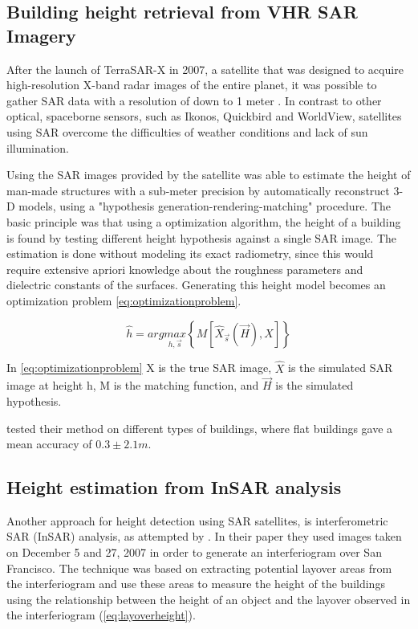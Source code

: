 \subsection{Building height retrieval from VHR SAR Imagery}
After the launch of TerraSAR-X in 2007, a satellite that was designed to acquire high-resolution X-band radar images of the entire planet, it was possible to gather SAR data with a resolution of down to 1 meter \citep{Airbus2017}. In contrast to other optical, spaceborne sensors, such as Ikonos, Quickbird and WorldView, satellites using SAR overcome the difficulties of weather conditions and lack of sun illumination.

Using the SAR images provided by the satellite \cite{Brunner2008} was able to estimate the height of man-made structures with a sub-meter precision by automatically reconstruct 3-D models, using a "hypothesis generation-rendering-matching" procedure. The basic principle was that using a optimization algorithm, the height of a building is found by testing different height hypothesis against a single SAR image. The estimation is done without modeling its exact radiometry, since this would require extensive apriori knowledge about the roughness parameters and dielectric constants of the surfaces. Generating this height model becomes an optimization problem \autoref{eq:optimizationproblem}.

\begin{equation}
	\hat{h} = arg \underset{h,\overrightarrow{s}}{max}\left\{M\left[\hat{X}_{\overrightarrow{s}}(\overrightarrow{H}),X\right]\right\}
	\label{eq:optimizationproblem}
\end{equation}

In \autoref{eq:optimizationproblem} X is the true SAR image, $\hat{X}$ is the simulated SAR image at height h, M is the matching function, and $\overrightarrow{H}$ is the simulated hypothesis.

\cite{Brunner2008} tested their method on different types of buildings, where flat buildings gave a mean accuracy of $0.3 \pm 2.1 m$. 

\subsection{Height estimation from InSAR analysis}
Another approach for height detection using SAR satellites, is interferometric SAR (InSAR) analysis, as attempted by \cite{Liu2015}. In their paper they used images taken on December 5 and 27, 2007 in order to generate an interferiogram over San Francisco. The technique was based on extracting potential layover areas from the interferiogram and use these areas to measure the height of the buildings using the relationship between the height of an object and the layover observed in the interferiogram (\autoref{eq:layoverheight}).

